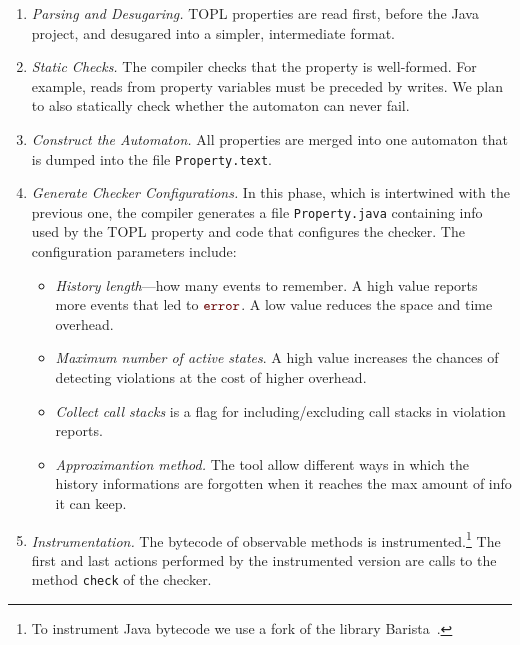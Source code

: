 \documentclass[9pt, preprint]{sigplanconf} %
\newcommand{\error}{\ensuremath{\textcolor{darkred}{\mathtt{error}}}\xspace}
\theoremstyle{definition}
\theoremstyle{remark}
\begin{document}
\begin{enumerate}
\item {\em Parsing and Desugaring.}
TOPL properties are read first, before the Java project, and desugared into a simpler, intermediate format. 
\item {\em Static Checks.} The compiler checks that the property is well-formed. For example, reads from property variables must be preceded by writes. We plan to also statically check whether the automaton can never fail.
%
\item {\em Construct the Automaton.} All properties are merged into one automaton that is  dumped into the file {\tt Property.text}.
%
\item {\em Generate Checker Configurations.}
In this phase, which is intertwined with the previous one, the compiler generates a file {\tt Property.java} containing 
info used by the TOPL property and code that configures the checker.
The configuration parameters include:
\begin{itemize}
\item \emph{History length}---how many events to remember.
  A high value reports more events that led to \error.
  A low value reduces the space and time overhead.
\item \emph{Maximum number of active states}.
  A high value increases the chances of detecting violations at the cost of higher  overhead.

\item \emph{Collect call stacks} is a flag for including/excluding  call stacks in violation reports.
%
\item {\em Approximantion method.} The tool allow different ways in which the history informations are forgotten when it reaches the max amount of info it can keep.
\end{itemize}
%
\item {\em Instrumentation.}
The bytecode of observable methods is instrumented.\footnote{To instrument Java bytecode we use a fork of the library 
Barista~\cite{barista}.}
The first and last actions performed by the instrumented version are calls to the method {\tt check} of the checker.
\end{enumerate}



\end{document}
